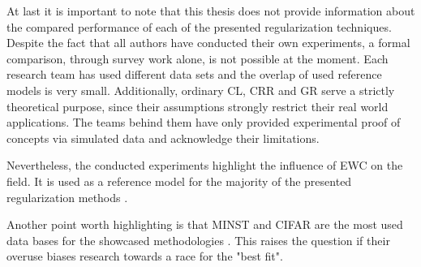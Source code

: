 At last it is important to note that this thesis does not provide information about the compared performance of each of the presented regularization techniques. Despite the fact that all authors have conducted their own experiments, a formal comparison, through survey work alone, is not possible at the moment. Each research team has used different data sets and the overlap of used reference models is very small. Additionally, ordinary CL, CRR and GR serve a strictly theoretical purpose, since their assumptions strongly restrict their real world applications. The teams behind them have only provided experimental proof of concepts via simulated data and acknowledge their limitations.

Nevertheless, the conducted experiments highlight the influence of EWC on the field. It is used as a reference model for the majority of the presented regularization methods \cite{zenke2017continuallearningsynapticintelligence, aljundi2018memoryawaresynapseslearning, yoon2018lifelonglearningdynamicallyexpandable, jung2021continuallearningnodeimportancebased, titsias2020functionalregularisationcontinuallearning}.

Another point worth highlighting is that MINST and CIFAR are the most used data bases for the showcased methodologies \cite{zenke2017continuallearningsynapticintelligence,yoon2018lifelonglearningdynamicallyexpandable, jung2021continuallearningnodeimportancebased, Wang_Liu_Duan_Tao_2022}. This raises the question if their overuse biases research towards a race for the "best fit".